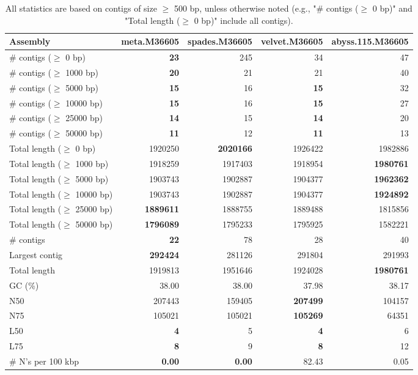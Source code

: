 \documentclass[12pt,a4paper]{article}
\begin{document}
\begin{table}[ht]
\begin{center}
\caption{All statistics are based on contigs of size $\geq$ 500 bp, unless otherwise noted (e.g., "\# contigs ($\geq$ 0 bp)" and "Total length ($\geq$ 0 bp)" include all contigs).}
\begin{tabular}{|l*{4}{|r}|}
\hline
Assembly & meta.M36605 & spades.M36605 & velvet.M36605 & abyss.115.M36605 \\ \hline
\# contigs ($\geq$ 0 bp) & {\bf 23} & 245 & 34 & 47 \\ \hline
\# contigs ($\geq$ 1000 bp) & {\bf 20} & 21 & 21 & 40 \\ \hline
\# contigs ($\geq$ 5000 bp) & {\bf 15} & 16 & {\bf 15} & 32 \\ \hline
\# contigs ($\geq$ 10000 bp) & {\bf 15} & 16 & {\bf 15} & 27 \\ \hline
\# contigs ($\geq$ 25000 bp) & {\bf 14} & 15 & {\bf 14} & 20 \\ \hline
\# contigs ($\geq$ 50000 bp) & {\bf 11} & 12 & {\bf 11} & 13 \\ \hline
Total length ($\geq$ 0 bp) & 1920250 & {\bf 2020166} & 1926422 & 1982886 \\ \hline
Total length ($\geq$ 1000 bp) & 1918259 & 1917403 & 1918954 & {\bf 1980761} \\ \hline
Total length ($\geq$ 5000 bp) & 1903743 & 1902887 & 1904377 & {\bf 1962362} \\ \hline
Total length ($\geq$ 10000 bp) & 1903743 & 1902887 & 1904377 & {\bf 1924892} \\ \hline
Total length ($\geq$ 25000 bp) & {\bf 1889611} & 1888755 & 1889488 & 1815856 \\ \hline
Total length ($\geq$ 50000 bp) & {\bf 1796089} & 1795233 & 1795925 & 1582221 \\ \hline
\# contigs & {\bf 22} & 78 & 28 & 40 \\ \hline
Largest contig & {\bf 292424} & 281126 & 291804 & 291993 \\ \hline
Total length & 1919813 & 1951646 & 1924028 & {\bf 1980761} \\ \hline
GC (\%) & 38.00 & 38.00 & 37.98 & 38.17 \\ \hline
N50 & 207443 & 159405 & {\bf 207499} & 104157 \\ \hline
N75 & 105021 & 105021 & {\bf 105269} & 64351 \\ \hline
L50 & {\bf 4} & 5 & {\bf 4} & 6 \\ \hline
L75 & {\bf 8} & 9 & {\bf 8} & 12 \\ \hline
\# N's per 100 kbp & {\bf 0.00} & {\bf 0.00} & 82.43 & 0.05 \\ \hline
\end{tabular}
\end{center}
\end{table}
\end{document}
